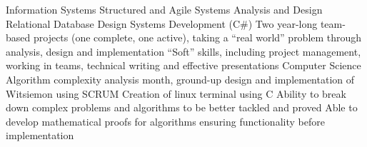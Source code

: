 \documentclass[]{awesome-cv}
\begin{document}
\begin{cventries}
\vspace{-4mm}
	\cventry
	{}
	{Information Systems \vspace{-5mm}}
	{} {}
	{Structured and Agile Systems Analysis and Design
\linebreak
Relational Database Design
\linebreak
Systems Development (C\#)
\linebreak
Two year-long team-based projects (one complete, one active), taking a “real world” problem through analysis, design and implementation
\linebreak
“Soft” skills, including project management, working in teams, technical writing and effective presentations \vspace{-3mm}}
\vspace{-5mm}
	\cventry
	{}
	{Computer Science \vspace{-5mm}}
	{}
	{}
	{Algorithm complexity analysis
	 month, ground-up design and implementation of Witsiemon using SCRUM
	\linebreak
	Creation of linux terminal using C
	\linebreak
	Ability to break down complex problems and algorithms to be better tackled and proved
	\linebreak
	Able to develop mathematical proofs for algorithms ensuring functionality before implementation}
\end{cventries}
\end{document}

